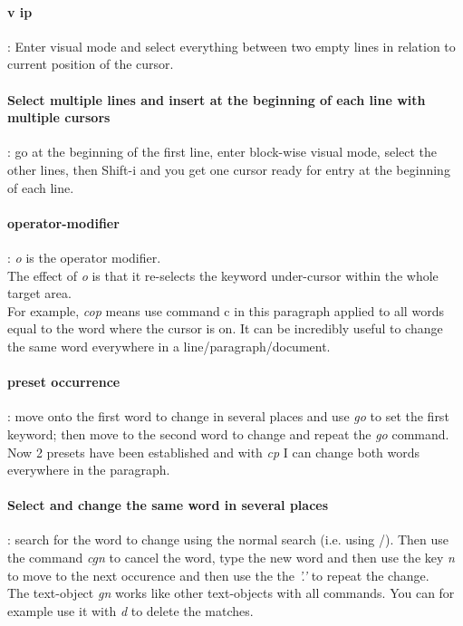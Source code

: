 \documentclass[10pt,letterpaper]{book}
\begin{document}
\paragraph{v ip}: Enter visual mode and select everything between two empty lines in relation to current position of the cursor.

\paragraph{Select multiple lines and insert at the beginning of each line with multiple cursors}: go at the beginning of the first line, enter block-wise visual mode, select the other lines, then Shift-i and you get one cursor ready for entry at the beginning of each line.

\paragraph{operator-modifier}: \textit{o} is the operator modifier.\\
The effect of \textit{o} is that it re-selects the keyword under-cursor within the whole target area.\\
For example, \textit{cop} means use command c in this paragraph applied to all words equal to the word where the cursor is on. It can be incredibly useful to change the same word everywhere in a line/paragraph/document.
\paragraph{preset occurrence}: move onto the first word to change in several places and use \textit{go} to set the first keyword; then move to the second word to change and repeat the \textit{go} command. Now 2 presets have been established and with \textit{cp} I can change both words everywhere in the paragraph.

\paragraph{Select and change the same word in several places}: search for the word to change using the normal search (i.e. using /). Then use the command \textit{cgn} to cancel the word, type the new word and then use the key \textit{n} to move to the next occurence and then use the the \textit{'.'} to repeat the change.\\
The text-object \textit{gn} works like other text-objects with all commands. You can for example use it with \textit{d} to delete the matches.
\end{document}
